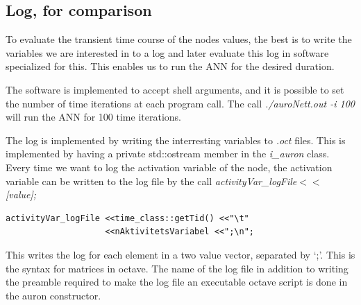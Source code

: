 %




\subsection{Log, for comparison}
\label{ssecLogForComparison}
To evaluate the transient time course of the nodes values, the best is to write the variables we are interested in to a log and later evaluate this log in software specialized for this.
This enables us to run the ANN for the desired duration. 

The software is implemented to accept shell arguments, and it is possible to set the number of time iterations at each program call.
The call \emph{./auroNett.out -i 100} will run the ANN for 100 time iterations.

The log is implemented by writing the interresting variables to \emph{.oct} files. This is implemented by having a private std::ostream member in the \emph{i\_auron} class.
Every time we want to log the activation variable of the node, the activation variable can be written to the log file by the call \emph{activityVar\_logFile$<<$ [value];}
\begin{lstlisting}
activityVar_logFile <<time_class::getTid() <<"\t" 
				    <<nAktivitetsVariabel <<";\n";
\end{lstlisting}

This writes the log for each element in a two value vector, separated by `;'. This is the syntax for matrices in octave.
%
The name of the log file in addition to writing the preamble required to make the log file an executable octave script is done in the auron constructor.

